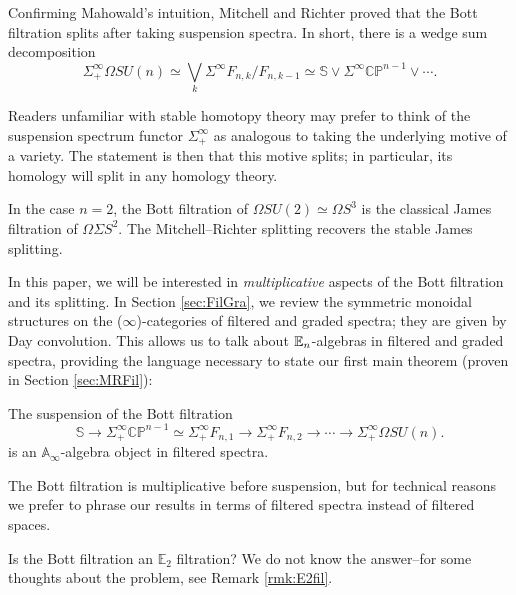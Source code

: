 Confirming Mahowald's intuition, Mitchell and Richter \cite[Theorem 2.1]{CrabbMitchell} proved that the Bott filtration splits after taking suspension spectra.  In short, there is a wedge sum decomposition
$$\Sigma^{\infty}_+ \Omega SU(n) \simeq \bigvee_k \Sigma^{\infty} F_{n,k}/F_{n,k-1} \simeq \mathbb{S} \vee \Sigma^{\infty} \mathbb{CP}^{n-1} \vee \cdots.$$

\begin{rmk}
Readers unfamiliar with stable homotopy theory may prefer to think of the suspension spectrum functor $\Sigma^\infty_+$ as analogous to taking the underlying motive of a variety.  The statement is then that this motive splits; in particular, its homology will split in any homology theory.  
\end{rmk}

\begin{exm}
In the case $n=2$, the Bott filtration of $\Omega SU(2) \simeq \Omega S^3$ is the classical James filtration of $\Omega \Sigma S^2$.  The Mitchell--Richter splitting recovers the stable James splitting.
\end{exm}

In this paper, we will be interested in \emph{multiplicative} aspects of the Bott filtration and its splitting.  In Section \ref{sec:FilGra}, we review the symmetric monoidal structures on the ($\infty$)-categories of filtered and graded spectra; they are given by Day convolution.  This allows us to talk about $\operatorname{\mathbb{E}}_n$-algebras in filtered and graded spectra, providing the language necessary to state our first main theorem (proven in Section \ref{sec:MRFil}):

\begin{thm} \label{thm:BottIsAoo}
The suspension of the Bott filtration 
$$\mathbb{S} \longrightarrow \Sigma_+^{\infty} \mathbb{CP}^{n-1} \simeq \Sigma_+^{\infty} F_{n,1} \longrightarrow \Sigma_+^{\infty} F_{n,2} \longrightarrow \cdots \longrightarrow \Sigma^{\infty}_+ \Omega SU(n).$$
is an $\mathbb{A}_\infty$-algebra object in filtered spectra.
\end{thm}

\begin{rmk}
The Bott filtration is multiplicative before suspension, but for technical reasons we prefer to phrase our results in terms of filtered spectra instead of filtered spaces.
\end{rmk}

\begin{qst} \label{qst:BottE2}
Is the Bott filtration an $\mathbb{E}_2$ filtration?  We do not know the answer--for some thoughts about the problem, see Remark \ref{rmk:E2fil}.
\end{qst}

